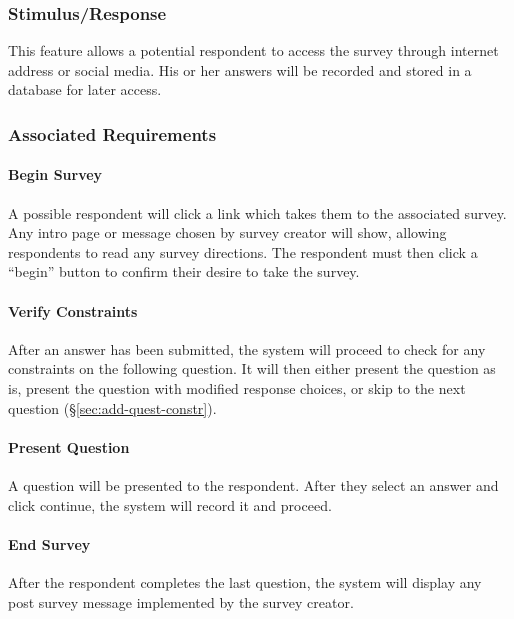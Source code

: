 \documentclass[10pt,letter]{report}
\begin{document}
\subsubsection{Stimulus/Response}
\label{sec:stim-resp-collection}

This feature allows a potential respondent to access the survey through
internet address or social media. His or her answers will be recorded and
stored in a database for later access.

\subsubsection{Associated Requirements}
\label{sec:assoc-reqs-collection}

\paragraph{Begin Survey}

A possible respondent will click a link which takes them to the associated
survey. Any intro page or message chosen by survey creator will show, allowing
respondents to read any survey directions. The respondent must then click a
 ``begin'' button to confirm their desire to take the survey.

\paragraph{Verify Constraints}
\label{sec:verify-constraints}

After an answer has been submitted, the system will proceed to check
for any constraints on the following question. It will then either
present the question as is, present the question with modified response
choices, or skip to the next question (\S\ref{sec:add-quest-constr}).

\paragraph{Present Question}

A question will be presented to the respondent. After they select an answer and
click continue, the system will record it and proceed.

\paragraph{End Survey}

After the respondent completes the last question, the system will display
any post survey message implemented by the survey creator.
\end{document}
